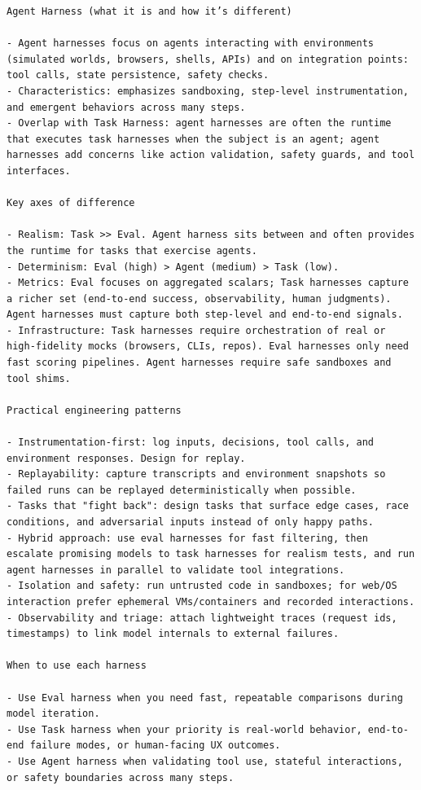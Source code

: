 \documentclass[aspectratio=169]{beamer}
\begin{document}
\begin{frame}[fragile]
\begin{verbatim}
Agent Harness (what it is and how it’s different)

- Agent harnesses focus on agents interacting with environments (simulated worlds, browsers, shells, APIs) and on integration points: tool calls, state persistence, safety checks.
- Characteristics: emphasizes sandboxing, step-level instrumentation, and emergent behaviors across many steps.
- Overlap with Task Harness: agent harnesses are often the runtime that executes task harnesses when the subject is an agent; agent harnesses add concerns like action validation, safety guards, and tool interfaces.

Key axes of difference

- Realism: Task >> Eval. Agent harness sits between and often provides the runtime for tasks that exercise agents.
- Determinism: Eval (high) > Agent (medium) > Task (low).
- Metrics: Eval focuses on aggregated scalars; Task harnesses capture a richer set (end-to-end success, observability, human judgments). Agent harnesses must capture both step-level and end-to-end signals.
- Infrastructure: Task harnesses require orchestration of real or high-fidelity mocks (browsers, CLIs, repos). Eval harnesses only need fast scoring pipelines. Agent harnesses require safe sandboxes and tool shims.

Practical engineering patterns

- Instrumentation-first: log inputs, decisions, tool calls, and environment responses. Design for replay.
- Replayability: capture transcripts and environment snapshots so failed runs can be replayed deterministically when possible.
- Tasks that "fight back": design tasks that surface edge cases, race conditions, and adversarial inputs instead of only happy paths.
- Hybrid approach: use eval harnesses for fast filtering, then escalate promising models to task harnesses for realism tests, and run agent harnesses in parallel to validate tool integrations.
- Isolation and safety: run untrusted code in sandboxes; for web/OS interaction prefer ephemeral VMs/containers and recorded interactions.
- Observability and triage: attach lightweight traces (request ids, timestamps) to link model internals to external failures.

When to use each harness

- Use Eval harness when you need fast, repeatable comparisons during model iteration.
- Use Task harness when your priority is real-world behavior, end-to-end failure modes, or human-facing UX outcomes.
- Use Agent harness when validating tool use, stateful interactions, or safety boundaries across many steps.


\end{verbatim}
\end{frame}
\end{document}
